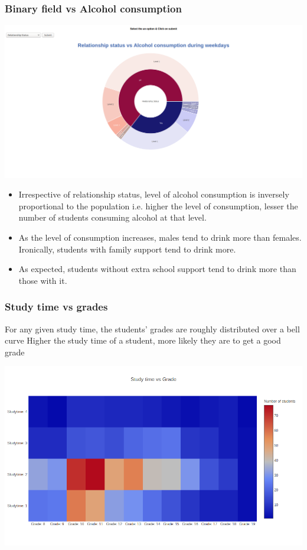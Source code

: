 \documentclass[titlepage, 12pt]{article}
\begin{document}
\subsubsection{Binary field vs Alcohol consumption}
\begin{center}
\includegraphics[scale=0.2]{2}
\end{center}
\begin{itemize}
    \item Irrespective of relationship status, level of alcohol consumption is inversely proportional to the population i.e. higher the level of consumption, lesser the number of students consuming alcohol at that level.
    \item As the level of consumption increases, males tend to drink more than females. Ironically, students with family support tend to drink more.
    \item As expected, students without extra school support tend to drink more than those with it.
\end{itemize}
\subsubsection{Study time vs grades}
For any given study time, the students’ grades are roughly distributed over a bell curve
Higher the study time of a student, more likely they are to get a good grade
\begin{center}
\includegraphics[scale=0.3]{3}
\end{center}
\end{document}
